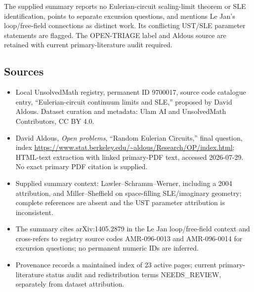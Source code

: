 \documentclass[11pt]{article}
\begin{document}
The supplied summary reports no Eulerian-circuit scaling-limit theorem or SLE identification, points to separate excursion questions, and mentions Le Jan's loop/free-field connections as distinct work. Its conflicting UST/SLE parameter statements are flagged. The OPEN-TRIAGE label and Aldous source are retained with current primary-literature audit required.
\subsection{Sources}
\begin{itemize}
\item Local UnsolvedMath registry, permanent ID 9700017, source code catalogue entry, ``Eulerian-circuit continuum limits and SLE,'' proposed by David Aldous. Dataset curation and metadata: Ulam AI and UnsolvedMath Contributors, CC BY 4.0.
\item David Aldous, \emph{Open problems}, ``Random Eulerian Circuits,'' final question, index \url{https://www.stat.berkeley.edu/~aldous/Research/OP/index.html}; HTML-text extraction with linked primary-PDF text, accessed 2026-07-29. No exact primary PDF citation is supplied.
\item Supplied summary context: Lawler--Schramm--Werner, including a 2004 attribution, and Miller--Sheffield on space-filling SLE/imaginary geometry; complete references are absent and the UST parameter attribution is inconsistent.
\item The summary cites arXiv:1405.2879 in the Le Jan loop/free-field context and cross-refers to registry source codes AMR-096-0013 and AMR-096-0014 for excursion questions; no permanent numeric IDs are inferred.
\item Provenance records a maintained index of 23 active pages; current primary-literature status audit and redistribution terms NEEDS\_REVIEW, separately from dataset attribution.
\end{itemize}
\end{document}
